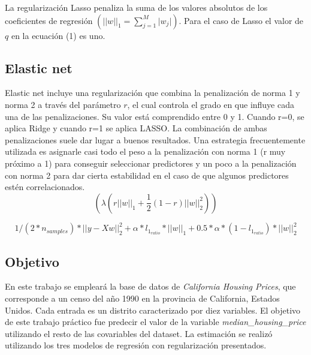 \documentclass[11pt]{article}
\begin{document}
La regularización Lasso penaliza la suma de los valores absolutos de los
coeficientes de regresión
\((||w||_1 = \sum_{j=1} ^M \lvert w_j \rvert)\). Para el caso de Lasso
el valor de \(q\) en la ecuación (1) es uno.

\hypertarget{elastic-net}{%
\subsection{Elastic net}\label{elastic-net}}

Elastic net incluye una regularización que combina la penalización de
norma 1 y norma 2 a través del parámetro \(r\), el cual controla el
grado en que influye cada una de las penalizaciones. Su valor está
comprendido entre 0 y 1. Cuando r=0, se aplica Ridge y cuando r=1 se
aplica LASSO. La combinación de ambas penalizaciones suele dar lugar a
buenos resultados. Una estrategia frecuentemente utilizada es asignarle
casi todo el peso a la penalización con norma 1 (r muy próximo a 1) para
conseguir seleccionar predictores y un poco a la penalización con norma
2 para dar cierta estabilidad en el caso de que algunos predictores
estén correlacionados.
\[(\lambda(r||w||_1 + \frac{1}{2}(1- r)||w||^2_2))\]

\[1 / (2 * n_{samples}) * ||y - Xw||^2_2 + \alpha * l_{1_{ratio}} * ||w||_1 + 0.5 * \alpha * (1 - l_{1_{ratio}}) * ||w||^2_2\]

\hypertarget{objetivo}{%
\subsection{Objetivo}\label{objetivo}}

En este trabajo se empleará la base de datos de
\textit{California Housing Prices}, que corresponde a un censo del año
1990 en la provincia de California, Estados Unidos. Cada entrada es un
distrito caracterizado por diez variables. El objetivo de este trabajo
práctico fue predecir el valor de la variable
\textit{median\_housing\_price} utilizando el resto de las covariables
del dataset. La estimación se realizó utilizando los tres modelos de
regresión con regularización presentados.
\end{document}
